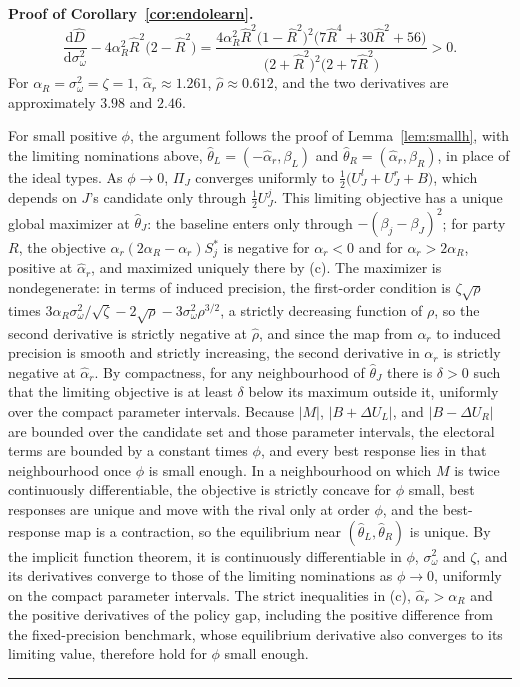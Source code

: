 \documentclass[12pt,letterpaper]{article}
\newenvironment{proof}[1][Proof]{\noindent\textbf{#1.} }{\ \rule{0.5em}{0.5em}}
\begin{document}
\begin{proof}[Proof of Corollary~\ref{cor:endolearn}]
\[
\frac{\mathrm{d}\widehat D}{\mathrm{d}\sigma_\omega^2}-4\alpha_R^2\widehat R^2\big(2-\widehat R^2\big)=\frac{4\alpha_R^2\widehat R^2\big(1-\widehat R^2\big)^2\big(7\widehat R^4+30\widehat R^2+56\big)}{\big(2+\widehat R^2\big)^2\big(2+7\widehat R^2\big)}>0 .
\]
For $\alpha_R=\sigma_\omega^2=\zeta=1$, $\widehat\alpha_r\approx1.261$, $\widehat \rho\approx0.612$, and the two derivatives are approximately $3.98$ and $2.46$.


For small positive $\phi$, the argument follows the proof of Lemma~\ref{lem:smallh}, with the limiting nominations above, $\widehat\theta_L=(-\widehat\alpha_r,\beta_L)$ and $\widehat\theta_R=(\widehat\alpha_r,\beta_R)$, in place of the ideal types. As $\phi\to0$, $\Pi_J$ converges uniformly to $\tfrac12\big(U_J^l+U_J^r+B\big)$, which depends on $J$'s candidate only through $\tfrac12U_J^j$. This limiting objective has a unique global maximizer at $\widehat\theta_J$: the baseline enters only through $-(\beta_j-\beta_J)^2$; for party $R$, the objective $\alpha_r(2\alpha_R-\alpha_r)S_j^*$ is negative for $\alpha_r<0$ and for $\alpha_r>2\alpha_R$, positive at $\widehat\alpha_r$, and maximized uniquely there by (c). The maximizer is nondegenerate: in terms of induced precision, the first-order condition is $\zeta \sqrt \rho$ times $3\alpha_R \sigma_\omega^2/\sqrt\zeta-2\sqrt \rho-3\sigma_\omega^2\rho^{3/2}$, a strictly decreasing function of $\rho$, so the second derivative is strictly negative at $\widehat \rho$, and since the map from $\alpha_r$ to induced precision is smooth and strictly increasing, the second derivative in $\alpha_r$ is strictly negative at $\widehat\alpha_r$. By compactness, for any neighbourhood of $\widehat\theta_J$ there is $\delta>0$ such that the limiting objective is at least $\delta$ below its maximum outside it, uniformly over the compact parameter intervals. Because $|M|$, $|B+\Delta U_L|$, and $|B-\Delta U_R|$ are bounded over the candidate set and those parameter intervals, the electoral terms are bounded by a constant times $\phi$, and every best response lies in that neighbourhood once $\phi$ is small enough. In a neighbourhood on which $M$ is twice continuously differentiable, the objective is strictly concave for $\phi$ small, best responses are unique and move with the rival only at order $\phi$, and the best-response map is a contraction, so the equilibrium near $(\widehat\theta_L,\widehat\theta_R)$ is unique. By the implicit function theorem, it is continuously differentiable in $\phi$, $\sigma_\omega^2$ and $\zeta$, and its derivatives converge to those of the limiting nominations as $\phi\to0$, uniformly on the compact parameter intervals. The strict inequalities in (c), $\widehat\alpha_r>\alpha_R$ and the positive derivatives of the policy gap, including the positive difference from the fixed-precision benchmark, whose equilibrium derivative also converges to its limiting value, therefore hold for $\phi$ small enough.
\end{proof}
\end{document}

